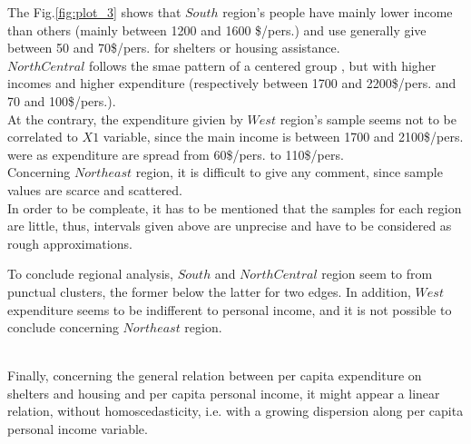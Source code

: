 \documentclass[12pt,letterpaper]{article}
\begin{document}
The Fig.\ref{fig:plot_3} shows that $South$ region's people have mainly lower income than others (mainly between  1200 and 1600 \$/pers.) and use generally give between 50 and 70\$/pers. for shelters or housing assistance. \\
$North Central$ follows the smae pattern of a centered group , but with higher incomes and higher expenditure (respectively between 1700 and 2200\$/pers. and 70 and 100\$/pers.). \\
At the contrary, the expenditure givien by $West$ region's sample seems not to be correlated to $X1$ variable, since the main income is between 1700 and 2100\$/pers. were as expenditure are spread from 60\$/pers. to 110\$/pers.  \\
Concerning $Northeast$ region, it is difficult to give any comment, since sample values are scarce and scattered. \\

In order to be compleate, it has to be mentioned that the samples for each region are little, thus, intervals given above are unprecise and have to be considered as rough approximations.

To conclude regional analysis, $South$ and $North Central$ region seem to from punctual clusters, the former below the latter for two edges. In addition, $West$ expenditure seems to be indifferent to personal income, and it is not possible to conclude concerning $Northeast$ region.
\\
\\
\par Finally, concerning the general relation between per capita expenditure on shelters and housing and per capita personal income, it might appear a linear relation, without homoscedasticity, i.e. with a growing dispersion along per capita personal income variable.
\end{document}

